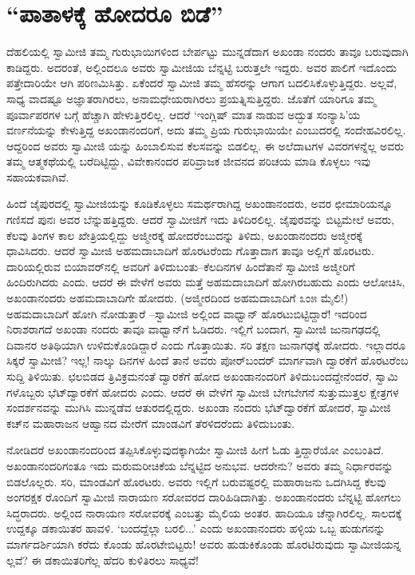 
\chapter{“ಪಾತಾಳಕ್ಕೆ ಹೋದರೂ ಬಿಡೆ”}

\noindent

ದೆಹಲಿಯಲ್ಲಿ ಸ್ವಾಮೀಜಿ ತಮ್ಮ ಗುರುಭಾಯಿಗಳಿಂದ ಬೇರ್ಪಟ್ಟು ಮುನ್ನಡೆದಾಗ ಅಖಂಡಾ ನಂದರು ತಾವೂ ಬರುವುದಾಗಿ ಕಾಡಿದ್ದರು. ಅದರಂತೆ, ಅಲ್ಲಿಂದಲೂ ಅವರು ಸ್ವಾಮೀಜಿಯ ಬೆನ್ನಟ್ಟಿ ಬರುತ್ತಲೇ ಇದ್ದರು. ಅವರ ಪಾಲಿಗೆ ಇದೊಂದು ಪತ್ತೇದಾರಿಯೇ ಆಗಿ ಪರಿಣಮಿಸಿತ್ತು. ಏಕೆಂದರೆ ಸ್ವಾಮೀಜಿ ತಮ್ಮ ಹೆಸರನ್ನು ಆಗಾಗ ಬದಲಿಸಿಕೊಳ್ಳುತ್ತಿದ್ದರು. ಅಲ್ಲವೆ, ಸಾಧ್ಯ ವಾದಷ್ಟೂ ಅಜ್ಞಾತರಾಗಿರಲು, ಅನಾಮಧೇಯರಾಗಿರಲು ಪ್ರಯತ್ನಿಸುತ್ತಿದ್ದರು. ಜೊತೆಗೆ ಯಾರಿಗೂ ತಮ್ಮ ಪೂರ್ವಾಪರಗಳ ಬಗ್ಗೆ ಹೆಚ್ಚಾಗಿ ಹೇಳುತ್ತಿರಲಿಲ್ಲ. ಆದರೆ ‘ಇಂಗ್ಲಿಷ್ ಮಾತ ನಾಡುವ ಅದ್ಭುತ ಸಂನ್ಯಾಸಿ’ಯ ವರ್ಣನೆಯನ್ನು ಕೇಳುತ್ತಿದ್ದ ಅಖಂಡಾನಂದರಿಗೆ, ಅದು ತಮ್ಮ ಪ್ರಿಯ ಗುರುಭಾಯಿಯೇ ಎಂಬುದರಲ್ಲಿ ಸಂದೇಹವಿರಲಿಲ್ಲ. ಆದ್ದರಿಂದ ಅವರು ಸ್ವಾಮೀಜಿ ಯನ್ನು ಹಿಂಬಾಲಿಸುವ ಕೆಲಸವನ್ನು ಬಿಡಲಿಲ್ಲ. ಈ ಅಲೆದಾಟಗಳ ವಿವರಗಳನ್ನೆಲ್ಲ ಅವರು ತಮ್ಮ ಆತ್ಮಕಥೆಯಲ್ಲಿ ಬರೆದಿಟ್ಟಿದ್ದು, ವಿವೇಕಾನಂದರ ಪರಿವ್ರಾಜಕ ಜೀವನದ ಪರಿಚಯ ಮಾಡಿ ಕೊಳ್ಳಲು ಇವು ಸಹಾಯಕವಾಗಿವೆ.

ಹಿಂದೆ ಜೈಪುರದಲ್ಲಿ ಸ್ವಾಮೀಜಿಯನ್ನು ಕೂಡಿಕೊಳ್ಳಲು ಸಮರ್ಥರಾಗಿದ್ದ ಅಖಂಡಾನಂದರು, ಅವರ ಛೀಮಾರಿಯನ್ನೂ ಗಣಿಸದೆ ಪುನಃ ಅವರ ಬೆನ್ನುಹತ್ತಿದ್ದರು. ಆದರೆ ಸ್ವಾಮೀಜಿಗೆ ಇದು ತಿಳಿದಿರಲಿಲ್ಲ. ಜೈಪುರವನ್ನು ಬಿಟ್ಟಮೇಲೆ ಅವರು, ಕೆಲವು ತಿಂಗಳ ಕಾಲ ಖೇತ್ರಿಯಲ್ಲಿದ್ದು ಅಜ್ಮೀರಕ್ಕೆ ಹೋದರೆಂಬುದನ್ನು ತಿಳಿದು, ಅಖಂಡಾನಂದರು ಅಜ್ಮೀರಕ್ಕೆ ಧಾವಿಸಿದರು. ಆದರೆ ಸ್ವಾಮೀಜಿ ಅಹಮದಾಬಾದಿಗೆ ಹೊರಟರೆಂದು ಗೊತ್ತಾದಾಗ ತಾವೂ ಅಲ್ಲಿಗೆ ಹೊರಟರು. ದಾರಿಯಲ್ಲಿರುವ ಬಿಯಾವರ್​ನಲ್ಲಿ ಅವರಿಗೆ ತಿಳಿದುಬಂತು–ಕೆಲದಿನಗಳ ಹಿಂದೆತಾನೆ ಸ್ವಾಮೀಜಿ ಅಜ್ಮೀರಿಗೆ ಹಿಂದಿರುಗಿದರು ಎಂದು. ಆದರೆ ಈ ವೇಳೆಗೆ ಅವರು ಮತ್ತೆ ಅಹಮದಾಬಾದಿಗೆ ಹೋಗಿರಬಹುದು ಎಂದು ಆಲೋಚಿಸಿ, ಅಖಂಡಾನಂದರು ಅಹಮದಾಬಾದಿಗೇ ಹೋದರು. (ಅಜ್ಮೀರದಿಂದ ಅಹಮದಾಬಾದಿಗೆ ೩ಂ೫ ಮೈಲಿ!) ಅಹಮದಾಬಾದಿಗೆ ಹೋಗಿ ನೋಡುತ್ತಾರೆ –ಸ್ವಾಮೀಜಿ ಅಲ್ಲಿಂದ ವಾಧ್ವಾನ್ ಹೊರಟುಬಿಟ್ಟಿದ್ದಾರೆ! ಇದರಿಂದ ನಿರಾಶರಾಗದೆ ಅಖಂಡಾ ನಂದರು ತಾವೂ ವಾಧ್ವಾನ್​ಗೆ ಓಡಿದರು. ಇಲ್ಲಿಗೆ ಬಂದಾಗ, ಸ್ವಾಮೀಜಿ ಜುನಾಗಢದಲ್ಲಿ ದಿವಾನರ ಅತಿಥಿಯಾಗಿ ಉಳಿದುಕೊಂಡಿದ್ದಾರೆ ಎಂದು ಗೊತ್ತಾಯಿತು. ಸರಿ ತಕ್ಷಣ ಜುನಾಗಢಕ್ಕೆ ಹೋದರು. ಇಲ್ಲಾದರೂ ಸಿಕ್ಕರೆ ಸ್ವಾಮೀಜಿ? ಇಲ್ಲ! ನಾಲ್ಕು ದಿನಗಳ ಹಿಂದೆ ತಾನೆ ಅವರು ಪೋರ್​ಬಂದರ್ ಮಾರ್ಗವಾಗಿ ದ್ವಾರಕೆಗೆ ಹೊರಟರೆಂಬ ಸುದ್ದಿ ತಿಳಿಯಿತು. ಛಲಬಿಡದ ತ್ರಿವಿಕ್ರಮನಂತೆ ದ್ವಾರಕೆಗೆ ಹೋದ ಅಖಂಡಾನಂದರಿಗೆ ತಿಳಿದುಬಂದದ್ದೇನೆಂದರೆ, ಸ್ವಾಮಿ ಗಳೊಬ್ಬರು ಭೆಟ್​ದ್ವಾರಕೆಗೆ ಹೋದರು ಎಂದು. ಆದರೆ ಈ ವೇಳೆಗೆ ಸ್ವಾಮೀಜಿ ಬೇಗಬೇಗನೆ ಸುತ್ತುಮುತ್ತಲ ಕ್ಷೇತ್ರಗಳ ಸಂದರ್ಶನವನ್ನು ಮುಗಿಸಿ ಮುನ್ನಡೆವ ಆತುರದಲ್ಲಿದ್ದರು. ಅಖಂಡಾ ನಂದರು ಭೆಟ್​ದ್ವಾರಕೆಗೆ ಹೋದರೆ, ಸ್ವಾಮೀಜಿ ಕಚ್​ನ ಮಹಾರಾಜನ ಆಹ್ವಾನದ ಮೇರೆಗೆ ಮಾಂಡವಿಗೆ ತೆರಳಿದರೆಂದು ತಿಳಿದುಬಂತು.

ನೋಡಿದರೆ ಅಖಂಡಾನಂದರಿಂದ ತಪ್ಪಿಸಿಕೊಳ್ಳುವುದಕ್ಕಾಗಿಯೇ ಸ್ವಾಮೀಜಿ ಹೀಗೆ ಓಡು ತ್ತಿದ್ದಾರೆಯೋ ಎಂಬಂತಿದೆ. ಅಖಂಡಾನಂದರಿಗಂತೂ ಇದು ಮರುಮರೀಚಿಕೆಯ ಬೆನ್ನಟ್ಟಿದ ಅನುಭವ. ಆದರೇನು? ಅವರು ತಮ್ಮ ನಿರ್ಧಾರವನ್ನು ಬಿಡಲೊಲ್ಲರು. ಸರಿ, ಮಾಂಡವಿಗೆ ಹೊರಟರು. ಅವರು ಇಲ್ಲಿಗೆ ಬರುವಷ್ಟರಲ್ಲಿ ಮಹಾರಾಜನು ಒದಗಿಸಿದ್ದ ಕೆಲವು ಅಂಗರಕ್ಷಕ ರೊಂದಿಗೆ ಸ್ವಾಮೀಜಿ ನಾರಾಯಣ ಸರೋವರದ ದಾರಿಹಿಡಿದಾಗಿತ್ತು. ಅಖಂಡಾನಂದರು ಬೆನ್ನಟ್ಟಿ ಹೋಗಲು ಸಿದ್ಧರಾದರು. ಅಲ್ಲಿಂದ ನಾರಾಯಣ ಸರೋವರಕ್ಕೆ ಎಂಬತ್ತು ಮೈಲಿಯ ಅಂತರ. ಹಾದಿಯೂ ಚೆನ್ನಾಗಿರಲಿಲ್ಲ. ಸಾಲದಕ್ಕೆ ಉದ್ದಕ್ಕೂ ಡಕಾಯಿತರ ಹಾವಳಿ. ‘ಬಂದದ್ದೆಲ್ಲಾ ಬರಲಿ...’ ಎಂದು ಅಖಂಡಾನಂದರು ಹಳ್ಳಿಯ ಒಬ್ಬ ಹುಡುಗನನ್ನು ಮಾರ್ಗದರ್ಶಿಯಾಗಿ ಕರೆದು ಕೊಂಡು ಹೊರಟೇಬಿಟ್ಟರು! ಅವರು ಹುಡುಕಿಕೊಂಡು ಹೊರಟಿರುವುದು ಸ್ವಾಮೀಜಿಯನ್ನ ಲ್ಲವೆ? ಈ ಡಕಾಯಿತರಿಗೆಲ್ಲ ಹೆದರಿ ಕುಳಿತಿರಲು ಸಾಧ್ಯವೆ!


